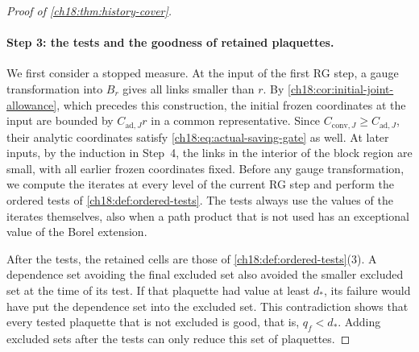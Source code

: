 \begin{proof}[Proof of \cref{ch18:thm:history-cover}]
\paragraph{Step 3: the tests and the goodness of retained plaquettes.}
We first consider a stopped measure. At the input of the first RG step, a gauge transformation into $B_r$ gives all links smaller than $r$. By \cref{ch18:cor:initial-joint-allowance}, which precedes this construction, the initial frozen coordinates at the input are bounded by $C_{\mathrm{ad},J}r$ in a common representative. Since $C_{\mathrm{conv},J}\ge C_{\mathrm{ad},J}$, their analytic coordinates satisfy \eqref{ch18:eq:actual-saving-gate} as well. At later inputs, by the induction in Step~4, the links in the interior of the block region are small, with all earlier frozen coordinates fixed. Before any gauge transformation, we compute the iterates at every level of the current RG step and perform the ordered tests of \cref{ch18:def:ordered-tests}. The tests always use the values of the iterates themselves, also when a path product that is not used has an exceptional value of the Borel extension.

After the tests, the retained cells are those of \cref{ch18:def:ordered-tests}(3). A dependence set avoiding the final excluded set also avoided the smaller excluded set at the time of its test. If that plaquette had value at least $d_*$, its failure would have put the dependence set into the excluded set. This contradiction shows that every tested plaquette that is not excluded is good, that is, $q_f<d_*$. Adding excluded sets after the tests can only reduce this set of plaquettes.


\end{proof}
